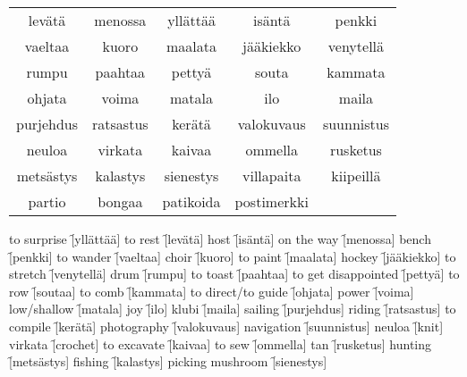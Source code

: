 \begin{center}
  \begin{tabular}{|c c c c c|}
    \hline
    levätä & menossa & yllättää & isäntä & penkki \\
    vaeltaa & kuoro & maalata & jääkiekko & venytellä \\
    rumpu & paahtaa & pettyä & souta & kammata \\
    ohjata & voima & matala & ilo & maila \\
    purjehdus & ratsastus & kerätä & valokuvaus & suunnistus \\
    neuloa & virkata & kaivaa & ommella & rusketus \\
    metsästys & kalastys & sienestys & villapaita & kiipeillä \\
    partio & bongaa & patikoida & postimerkki & \\
    \hline
  \end{tabular}
\end{center}

\begin{questions}
  \begin{multicols}{3}
    \raggedcolumns
    \question to surprise \f[yllättää]
    \question to rest     \f[levätä]
    \question host        \f[isäntä]
    \question on the way  \f[menossa]
    \question bench       \f[penkki]
    \question to wander   \f[vaeltaa]
    \question choir       \f[kuoro]
    \question to paint    \f[maalata]
    \question hockey      \f[jääkiekko]
    \question to stretch  \f[venytellä]
    \question drum        \f[rumpu]
    \question to toast    \f[paahtaa]
    \question to get disappointed     \f[pettyä]
    \question to row                  \f[soutaa]
    \question to comb                 \f[kammata]
    \question to direct/to guide      \f[ohjata]
    \question power                   \f[voima]
    \question low/shallow             \f[matala]
    \question joy                     \f[ilo]
    \question klubi                   \f[maila]
    \question sailing                 \f[purjehdus]
    \question riding                  \f[ratsastus]
    \question to compile              \f[kerätä]
    \question photography             \f[valokuvaus]
    \question navigation              \f[suunnistus]
    \question neuloa                  \f[knit]
    \question virkata                 \f[crochet]
    \question to excavate             \f[kaivaa]
    \question to sew                  \f[ommella]
    \question tan                \f[rusketus]
    \question hunting            \f[metsästys]
    \question fishing            \f[kalastys]
    \question picking mushroom   \f[sienestys]
  \end{multicols}
\end{questions}
